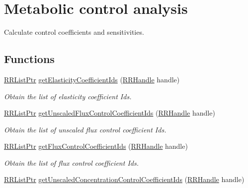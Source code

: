 \hypertarget{group__mca}{\section{Metabolic control analysis}
\label{group__mca}
}


Calculate control coefficients and sensitivities.  


\subsection*{Functions}
\begin{DoxyCompactItemize}
\item 
\hyperlink{rrc__types_8h_a32a8a60ac06858ff3a791672bd2bec73}{R\-R\-List\-Ptr} \hyperlink{group__mca_gacad76b5762c25a32e413b99e9b2cfb10}{get\-Elasticity\-Coefficient\-Ids} (\hyperlink{rrc__types_8h_a1d68f0592372208fa5a5f2799ea4b3ae}{R\-R\-Handle} handle)
\begin{DoxyCompactList}\small\item\em Obtain the list of elasticity coefficient Ids. \end{DoxyCompactList}\item 
\hyperlink{rrc__types_8h_a32a8a60ac06858ff3a791672bd2bec73}{R\-R\-List\-Ptr} \hyperlink{group__mca_ga90f444f3a93b225edda7264df6dbdb12}{get\-Unscaled\-Flux\-Control\-Coefficient\-Ids} (\hyperlink{rrc__types_8h_a1d68f0592372208fa5a5f2799ea4b3ae}{R\-R\-Handle} handle)
\begin{DoxyCompactList}\small\item\em Obtain the list of unscaled flux control coefficient Ids. \end{DoxyCompactList}\item 
\hyperlink{rrc__types_8h_a32a8a60ac06858ff3a791672bd2bec73}{R\-R\-List\-Ptr} \hyperlink{group__mca_ga9c427f19db0adbed6fd5642aa2f921ba}{get\-Flux\-Control\-Coefficient\-Ids} (\hyperlink{rrc__types_8h_a1d68f0592372208fa5a5f2799ea4b3ae}{R\-R\-Handle} handle)
\begin{DoxyCompactList}\small\item\em Obtain the list of flux control coefficient Ids. \end{DoxyCompactList}\item 
\hyperlink{rrc__types_8h_a32a8a60ac06858ff3a791672bd2bec73}{R\-R\-List\-Ptr} \hyperlink{group__mca_ga5eafcd38aa64319b3952f3379118a460}{get\-Unscaled\-Concentration\-Control\-Coefficient\-Ids} (\hyperlink{rrc__types_8h_a1d68f0592372208fa5a5f2799ea4b3ae}{R\-R\-Handle} handle)

\end{DoxyCompactItemize}
